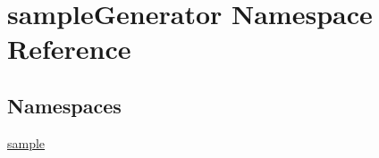 \hypertarget{namespacesample_generator}{}\section{sample\+Generator Namespace Reference}
\label{namespacesample_generator}
\subsection*{Namespaces}
\begin{DoxyCompactItemize}
\item 
 \hyperlink{namespacesample_generator_1_1sample}{sample}
\end{DoxyCompactItemize}
